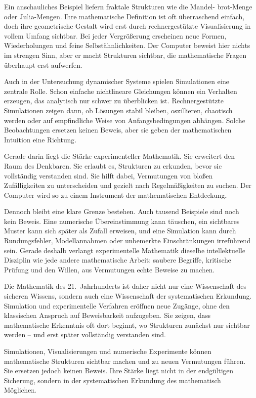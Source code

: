 Ein anschauliches Beispiel liefern fraktale Strukturen wie die Mandel- \newline brot-Menge oder Julia-Mengen. Ihre mathematische Definition ist oft überraschend einfach, doch ihre geometrische Gestalt wird erst durch rechnergestützte Visualisierung in vollem Umfang sichtbar. Bei jeder Vergrößerung erscheinen neue Formen, Wiederholungen und feine Selbstähnlichkeiten. Der Computer beweist hier nichts im strengen Sinn, aber er macht Strukturen sichtbar, die mathematische Fragen überhaupt erst aufwerfen.

Auch in der Untersuchung dynamischer Systeme spielen Simulationen eine zentrale Rolle. Schon einfache nichtlineare Gleichungen können ein Verhalten erzeugen, das analytisch nur schwer zu überblicken ist. Rechnergestützte Simulationen zeigen dann, ob Lösungen stabil bleiben, oszillieren, chaotisch werden oder auf empfindliche Weise von Anfangsbedingungen abhängen. Solche Beobachtungen ersetzen keinen Beweis, aber sie geben der mathematischen Intuition eine Richtung.

Gerade darin liegt die Stärke experimenteller Mathematik. Sie erweitert den Raum des Denkbaren. Sie erlaubt es, Strukturen zu erkunden, bevor sie vollständig verstanden sind. Sie hilft dabei, Vermutungen von bloßen Zufälligkeiten zu unterscheiden und gezielt nach Regelmäßigkeiten zu suchen. Der Computer wird so zu einem Instrument der mathematischen Entdeckung.

Dennoch bleibt eine klare Grenze bestehen. Auch tausend Beispiele sind noch kein Beweis. Eine numerische Übereinstimmung kann täuschen, ein sichtbares Muster kann sich später als Zufall erweisen, und eine Simulation kann durch Rundungsfehler, Modellannahmen oder unbemerkte Einschränkungen irreführend sein. Gerade deshalb verlangt experimentelle Mathematik dieselbe intellektuelle Disziplin wie jede andere mathematische Arbeit: saubere Begriffe, kritische Prüfung und den Willen, aus Vermutungen echte Beweise zu machen.

Die Mathematik des 21.~Jahrhunderts ist daher nicht nur eine Wissenschaft des sicheren Wissens, sondern auch eine Wissenschaft der systematischen Erkundung. Simulation und experimentelle Verfahren eröffnen neue Zugänge, ohne den klassischen Anspruch auf Beweisbarkeit aufzugeben. Sie zeigen, dass mathematische Erkenntnis oft dort beginnt, wo Strukturen zunächst nur sichtbar werden -- und erst später vollständig verstanden sind.

\begin{DidacticBox}
	\label{box:experimentelle-mathematik}
	Simulationen, Visualisierungen und numerische Experimente können mathematische Strukturen sichtbar machen und zu neuen Vermutungen führen. Sie ersetzen jedoch keinen Beweis. Ihre Stärke liegt nicht in der endgültigen Sicherung, sondern in der systematischen Erkundung des mathematisch Möglichen.
\end{DidacticBox}

